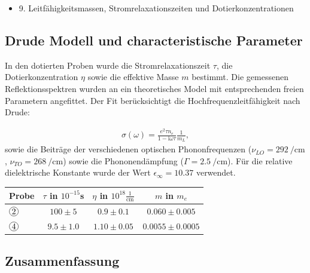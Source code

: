 \documentclass[paper=a4,fontsize=10pt,DIV=18,twocolumn,parskip=half]{scrartcl}
\numberwithin{equation}{section}    %
\begin{document}
\begin{itemize}
\item 9. Leitfähigkeitsmassen, Stromrelaxationszeiten und Dotierkonzentrationen
\end{itemize}

\subsection{Drude Modell und characteristische Parameter}

In den dotierten Proben wurde die Stromrelaxationszeit $\tau$, die 
Dotierkonzentration $\eta$ sowie die effektive Masse $m$ bestimmt. Die 
gemessenen Reflektionsspektren wurden an ein theoretisches Model mit 
entsprechenden freien Parametern angefittet. Der Fit berücksichtigt die 
Hochfrequenzleitfähigkeit nach Drude:

\begin{align}
    \sigma(\omega) = \frac{e^2 \tau n_e}{1-\text{i}\omega\tau} 
    \frac{1}{m_L},
\end{align}
sowie die Beiträge der verschiedenen optischen Phononfrequenzen 
($\nu_{LO}=\SI{292}{\per\centi\meter}$, $\nu_{TO}=\SI{268}{\per\centi\meter}$) 
sowie die Phononendämpfung ($\Gamma=\SI{2.5}{\per\centi\meter}$). Für die 
relative dielektrische Konstante wurde der Wert $\epsilon_{\infty}=10.37$ 
verwendet.

\begin{tabular}{l c c c}
    Probe & $\tau$ in $10^{-15}$s & $\eta$ in $10^{18} \frac{1}{\text{cm}}$ &
   $m$ in $m_e$ \\
   \hline
   $\circled{2}$ & $100\pm5$ & $0.9\pm0.1$ & $0.060\pm0.005$ \\
   $\circled{4}$ & $9.5\pm1.0$ & $1.10\pm0.05$ & $0.0055\pm0.0005$
\end{tabular}





\subsection{Zusammenfassung}
\end{document}
